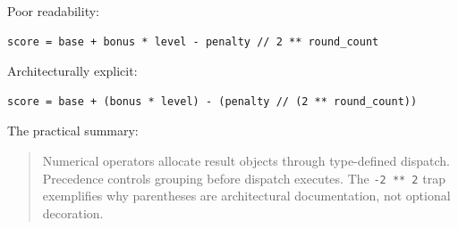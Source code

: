 Poor readability:

\begin{verbatim}
score = base + bonus * level - penalty // 2 ** round_count
\end{verbatim}

Architecturally explicit:

\begin{verbatim}
score = base + (bonus * level) - (penalty // (2 ** round_count))
\end{verbatim}

The practical summary:

\begin{quote}
Numerical operators allocate result objects through type-defined dispatch. Precedence controls grouping before dispatch executes. The \texttt{-2 ** 2} trap exemplifies why parentheses are architectural documentation, not optional decoration.
\end{quote}
